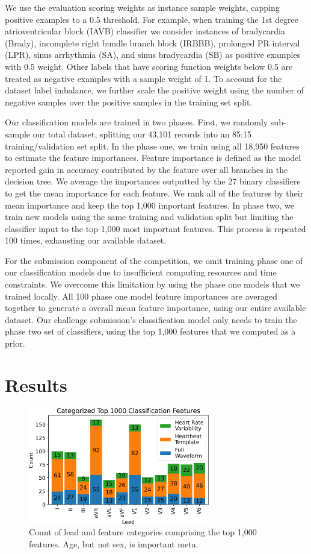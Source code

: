 \documentclass[\main/thesis.tex]{subfiles}
\begin{document}
We use the evaluation scoring weights as instance sample weights, capping positive examples to a 0.5 threshold.
For example, when training the 1st degree atrioventricular block (IAVB) classifier we consider instances of bradycardia (Brady), incomplete right bundle branch block (IRBBB), prolonged PR interval (LPR), sinus arrhythmia (SA), and sinus bradycardia (SB) as positive examples with 0.5 weight.
Other labels that have scoring function weights below 0.5 are treated as negative examples with a sample weight of 1.
To account for the dataset label imbalance, we further scale the positive weight using the number of negative samples over the positive samples in the training set split.

Our classification models are trained in two phases.
First, we randomly sub-sample our total dataset, splitting our 43,101 records into an 85:15 training/validation set split.
In the phase one, we train using all 18,950 features to estimate the feature importances.
Feature importance is defined as the model reported gain in accuracy contributed by the feature over all branches in the decision tree.
We average the importances outputted by the 27 binary classifiers to get the mean importance for each feature.
We rank all of the features by their mean importance and keep the top 1,000 important features.
In phase two, we train new models using the same training and validation split but limiting the classifier input to the top 1,000 most important features.
This process is repeated 100 times, exhausting our available dataset.

For the submission component of the competition, we omit training phase one of our classification models due to insufficient computing resources and time constraints.
We overcome this limitation by using the phase one models that we trained locally.
All 100 phase one model feature importances are averaged together to generate a overall mean feature importance, using our entire available dataset.
Our challenge submission's classification model only needs to train the phase two set of classifiers, using the top 1,000 features that we computed as a prior.

\section{Results}

\begin{figure}[ht]
  \centering
  \includegraphics[width=7.9cm]{figure/xgb_top_features_bar.png}
  \caption[Decision tree derived counts of important features by feature category.]{Count of lead and feature categories comprising the top 1,000 features. Age, but not sex, is important meta.}
  \label{fig:xgb_top_features}
\end{figure}
\end{document}
